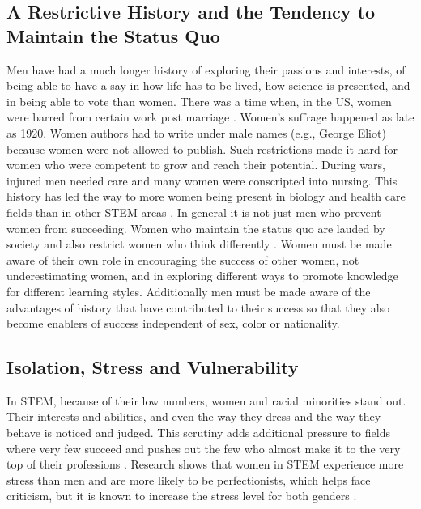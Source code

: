 \documentclass[utf8]{frontiersSCNS} %
\begin{document}
\subsection{A Restrictive History and the Tendency to Maintain the Status Quo}
\label{Sec3}
Men have had a much longer history of exploring their passions and interests, of being able to have a say in how life has to be lived, how science is presented, and in being able to vote than women. There was a time when, in the US, women were barred from certain work post marriage \citep{rindfuss1996women}. Women’s suffrage happened as late as 1920. Women authors had to write under male names (e.g., George Eliot) because women were not allowed to publish. Such restrictions made it hard for women who were competent to grow and reach their potential. During wars, injured men needed care and many women were conscripted into nursing. This history has led the way to more women being present in biology and health care fields than in other STEM areas \citep{amott1996race,drew2011women}. In general it is not just men who prevent women from succeeding. Women who maintain the status quo are lauded by society and also restrict women who think differently \citep{rudman2012status}. Women must be made aware of their own role in encouraging the success of other women, not underestimating women, and in exploring different ways to promote knowledge for different learning styles. Additionally men must be made aware of the advantages of history that have contributed to their success so that they also become enablers of success independent of sex, color or nationality.



\subsection{Isolation, Stress and Vulnerability}
 In STEM, because of their low numbers, women and racial minorities stand out. Their interests and abilities, and even the way they dress and the way they behave is noticed and judged. This scrutiny adds additional pressure to fields where very few succeed and pushes out the few who almost make it to the very top of their professions \citep{pollack2013there, 2018Report}. Research shows that women in STEM experience more stress than men and are more likely to be perfectionists, which helps face criticism, but it is known to increase the stress level for both genders \citep{rice2015perfectionism}. %
 
\end{document}
